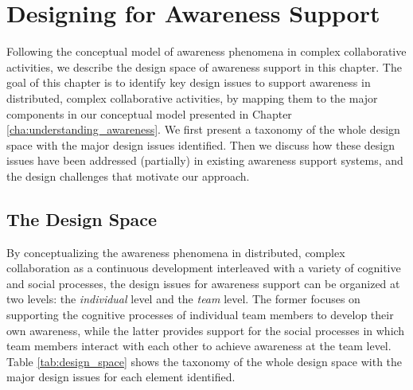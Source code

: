 \graphicspath{{Figures/}}

\chapter{Designing for Awareness Support} %
\label{cha:designing_for_awareness_support}
Following the conceptual model of awareness phenomena in complex collaborative activities, we describe the design space of awareness support in this chapter. The goal of this chapter is to identify key design issues to support awareness in distributed, complex collaborative activities, by mapping them to the major components in our conceptual model presented in Chapter \ref{cha:understanding_awareness}. We first present a taxonomy of the whole design space with the major design issues identified. Then we discuss how these design issues have been addressed (partially) in existing awareness support systems, and the design challenges that motivate our approach. 

\section{The Design Space} %
\label{sec:the_design_space}
By conceptualizing the awareness phenomena in distributed, complex collaboration as a continuous development interleaved with a variety of cognitive and social processes, the design issues for awareness support can be organized at two levels: the \emph{individual} level and the \emph{team} level. The former focuses on supporting the cognitive processes of individual team members to develop their own awareness, while the latter provides support for the social processes in which team members interact with each other to achieve awareness at the team level. Table \ref{tab:design_space} shows the taxonomy of the whole design space with the major design issues for each element identified.

